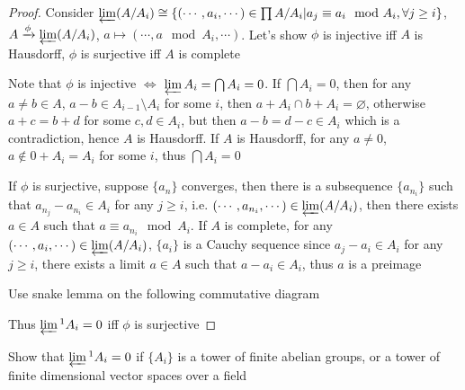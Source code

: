 \documentclass{article}
\newenvironment{exercise}[2][Exercise]{\begin{trivlist}
\item[\hskip \labelsep {\bfseries #1}\hskip \labelsep {\bfseries #2.}]}{\end{trivlist}}
\theoremstyle{definition}
\theoremstyle{remark}
\theoremstyle{definition}
\begin{document}
\begin{proof}
Consider $\varprojlim(A/A_i)\cong\left\{(\cdots,a_i,\cdots)\in \prod A/A_i\middle|a_j\equiv a_i\mod A_i, \forall j\geq i\right\}$, $A\xrightarrow\phi\varprojlim(A/A_i)$, $a\mapsto(\cdots,a\mod A_i,\cdots)$. Let's show $\phi$ is injective iff $A$ is Hausdorff, $\phi$ is surjective iff $A$ is complete \par
Note that $\phi$ is injective $\Leftrightarrow$ $\varprojlim A_i=\bigcap A_i=0$. If $\bigcap A_i=0$, then for any $a\neq b\in A$, $a-b\in A_{i-1}\setminus A_{i}$ for some $i$, then $a+A_{i}\cap b+A_i=\varnothing$, otherwise $a+c=b+d$ for some $c,d\in A_i$, but then $a-b=d-c\in A_i$ which is a contradiction, hence $A$ is Hausdorff. If $A$ is Hausdorff, for any $a\neq0$, $a\notin 0+A_i=A_i$ for some $i$, thus $\bigcap A_i=0$ \par
If $\phi$ is surjective, suppose $\{a_n\}$ converges, then there is a subsequence $\{a_{n_i}\}$ such that $a_{n_j}-a_{n_i}\in A_i$ for any $j\geq i$, i.e. $(\cdots,a_{n_i},\cdots)\in \varprojlim(A/A_i)$, then there exists $a\in A$ such that $a\equiv a_{n_i}\mod A_i$. If $A$ is complete, for any $(\cdots,a_i,\cdots)\in\varprojlim(A/A_i)$, $\{a_i\}$ is a Cauchy sequence since $a_j-a_i\in A_i$ for any $j\geq i$, there exists a limit $a\in A$ such that $a-a_i\in A_i$, thus $a$ is a preimage \par
Use snake lemma on the following commutative diagram
\begin{center}
\end{center}
Thus $\varprojlim\textstyle^1A_i=0$ iff $\phi$ is surjective
\end{proof}

\begin{exercise}{\textbf{3.5.2}}
Show that $\varprojlim\textstyle^1A_i=0$ if $\{A_i\}$ is a tower of finite abelian groups, or a tower of finite dimensional vector spaces over a field
\end{exercise}
\end{document}
